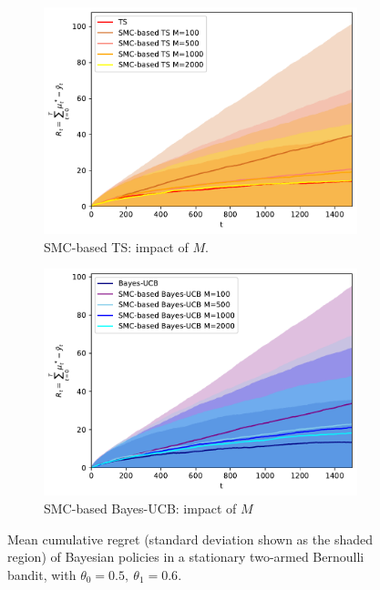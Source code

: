\begin{figure}[!h]
	\begin{subfigure}[b]{0.46\textwidth}
		\centering
		\includegraphics[width=\textwidth]{./fods_figs/static/bernoulli/A2/theta0.5_0.6_allM_cumulative_regret_ts}
		\caption{SMC-based TS: impact of $M$.}
	\end{subfigure}
	\begin{subfigure}[b]{0.46\textwidth}
		\centering
		\includegraphics[width=\textwidth]{./fods_figs/static/bernoulli/A2/theta0.5_0.6_allM_cumulative_regret_bucb}
		\caption{SMC-based Bayes-UCB: impact of $M$}
	\end{subfigure}
	
	\caption{Mean cumulative regret (standard deviation shown as the shaded region) of Bayesian policies in a stationary two-armed Bernoulli bandit, with $\theta_0=0.5, \ \theta_1=0.6$.}
\end{figure}

